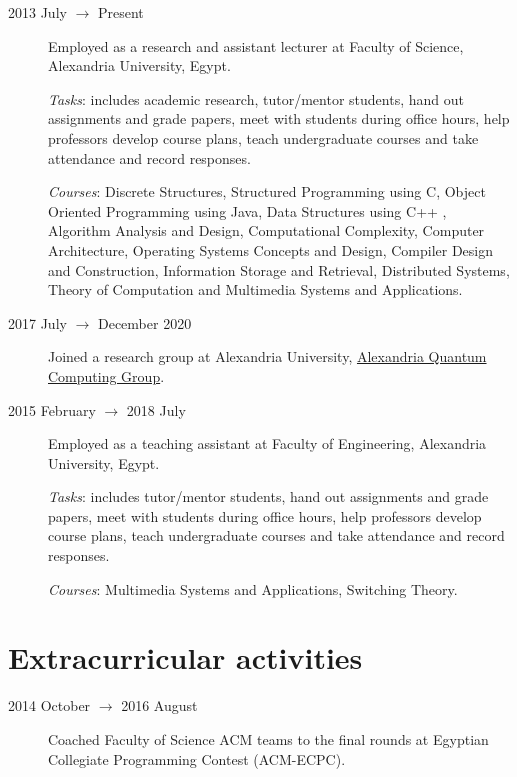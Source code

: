 \documentclass[margin,line,a4paper]{resume}
\begin{document}
\begin{resume}
\begin{description}
    
    \item[2013 July $\rightarrow$ Present] Employed as a research and assistant lecturer at Faculty of Science, Alexandria University, Egypt. 
    
    \emph{Tasks}: includes academic research, tutor/mentor students, hand out assignments and grade papers, meet with students during office hours, help professors develop course plans, teach undergraduate courses and take attendance and record responses.
       
    \emph{Courses}: Discrete Structures, Structured Programming using C, Object Oriented Programming using Java, Data Structures using C++ , Algorithm Analysis and Design, Computational Complexity, Computer Architecture, Operating Systems Concepts and Design, Compiler Design and Construction, Information Storage and Retrieval, Distributed Systems, Theory of Computation and Multimedia Systems and Applications.
    
        
	\item[2017 July $\rightarrow$ December 2020 ]  Joined a research group at Alexandria University, \href{http://www.sci.p.alexu.edu.eg/~aleqcg/index.html}{Alexandria Quantum Computing Group}.
    

        

	\item[2015 February $\rightarrow$ 2018 July] Employed as a teaching assistant at Faculty of Engineering, Alexandria University, Egypt. 
	
	\emph{Tasks}: includes tutor/mentor students, hand out assignments and grade papers, meet with students during office hours, help professors develop course plans, teach undergraduate courses and take attendance and record responses.        
    
	\emph{Courses}: Multimedia Systems and Applications, Switching Theory.
    
\end{description}



\section{\mysidestyle Extracurricular activities}\vspace{1mm}
    \begin{description}
    \item[2014 October $\rightarrow$ 2016 August] Coached Faculty of Science ACM teams to the final rounds at Egyptian Collegiate Programming Contest (ACM-ECPC).


\end{description}
\end{resume}
\end{document}
